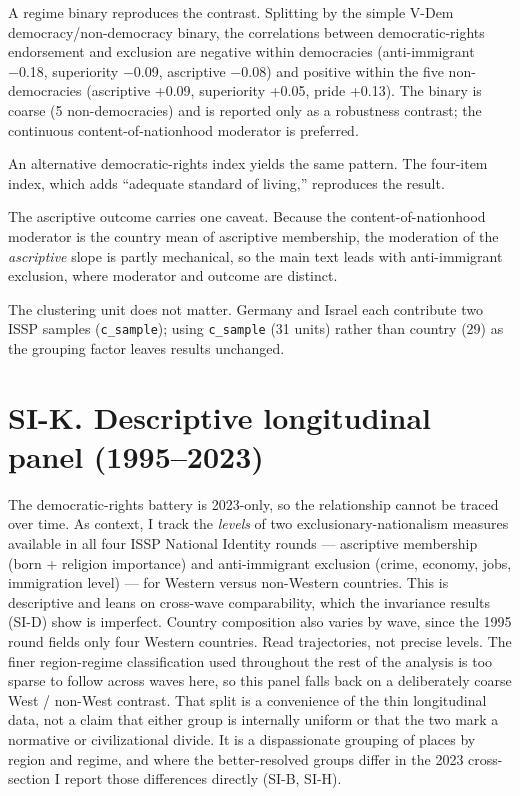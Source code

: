 A regime binary reproduces the contrast. Splitting by the simple V-Dem democracy/non-democracy binary, the correlations between democratic-rights endorsement and exclusion are negative within democracies (anti-immigrant −0.18, superiority −0.09, ascriptive −0.08) and positive within the five non-democracies (ascriptive +0.09, superiority +0.05, pride +0.13). The binary is coarse (5 non-democracies) and is reported only as a robustness contrast; the continuous content-of-nationhood moderator is preferred.

An alternative democratic-rights index yields the same pattern. The four-item index, which adds ``adequate standard of living,'' reproduces the result.

The ascriptive outcome carries one caveat. Because the content-of-nationhood moderator is the country mean of ascriptive membership, the moderation of the \emph{ascriptive} slope is partly mechanical, so the main text leads with anti-immigrant exclusion, where moderator and outcome are distinct.

The clustering unit does not matter. Germany and Israel each contribute two ISSP samples (\texttt{c\_sample}); using \texttt{c\_sample} (31 units) rather than country (29) as the grouping factor leaves results unchanged.

\clearpage
\section{SI-K. Descriptive longitudinal panel (1995--2023)}\label{si-k.-descriptive-longitudinal-panel-19952023}

The democratic-rights battery is 2023-only, so the relationship cannot be traced over time. As context, I track the \emph{levels} of two exclusionary-nationalism measures available in all four ISSP National Identity rounds --- ascriptive membership (born + religion importance) and anti-immigrant exclusion (crime, economy, jobs, immigration level) --- for Western versus non-Western countries. This is descriptive and leans on cross-wave comparability, which the invariance results (SI-D) show is imperfect. Country composition also varies by wave, since the 1995 round fields only four Western countries. Read trajectories, not precise levels. The finer region-regime classification used throughout the rest of the analysis is too sparse to follow across waves here, so this panel falls back on a deliberately coarse West / non-West contrast. That split is a convenience of the thin longitudinal data, not a claim that either group is internally uniform or that the two mark a normative or civilizational divide. It is a dispassionate grouping of places by region and regime, and where the better-resolved groups differ in the 2023 cross-section I report those differences directly (SI-B, SI-H).

